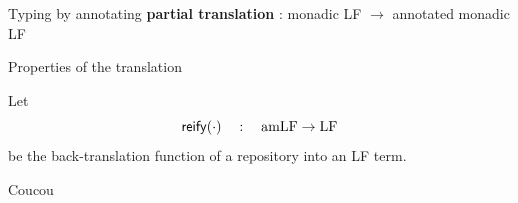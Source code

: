 \documentclass[ignorenonframetext,red]{beamer}
\newcommand\sz[1]{\hsubst{#1}\mmmv\mval}
\begin{document}
\begin{frame}{Typing by annotating}
  \textbf{partial translation} : monadic LF $\to$ annotated monadic LF
  \inXLFa
  \Large
  \begin{overlayarea}\textwidth{10em}
    \only<+>{
      $$
      \infer[VLam]{ \jannt\mr{\ebinddecl\me\mv\mf}\mo\mmf\mo }{
        \jannv\mr\me{\ulam\mv\mo}{\prd\mv\mf\mmf}{\lam\mv\mf\mo} }
      $$
    }
    \only<+>{
      $$
      \infer[LCons]{ \jannv\mr\me\mval\mf\mval \and
        \jannl\mr\me{\hsubst\mmf\mv\mval}\ma\ma{\lapp\mcf\ma} }{
        \jannl\mr\me{\prd\mv\mf\mmf}{\lcons\mval\ma}{\lcons\mval\ma}{\lapp\mcf\ma}
      }
      $$
    } 
    \normalsize
    \only<+>{
      \begin{align*}
        \sz{(\prd\mv\mf\mmf)} &= \prd\mv{\sz\mf}{\sz\mmf} \\
        \sz{(\sapply\ms{\lapp\mcf\ma})} &=
        \sapply{\sz\ms}{\lapp\mcf{\sz\ma}} \\[1em]
        \sz{(\scons\ms\mmv{\lapp\mv\ma:\lapp\mcf\mma})} &=
        \scons{(\sz\ms)}\mmv{\lapp\mv{\sz\ma}:\lapp\mcf{\sz\mma}} \\
        \sz{(\scons\ms\mmv{\lapp\mmmv\ma:\lapp\mcf\mma})} &=
        \fred\mmv\ms\mval\ma \\[1em]
        \fred\mmv\ms{\mh:\lapp\mcf\ma}\lnil &=
        \scons\ms\mmv{\mh:\lapp\mcf\ma} \\
        \fred\mmv\ms{\lam\mv\mf\mo}{(\lcons\mval\ma)} &=
        \fred\mmv{\ms\cup\mms}\mmval\ma
        \qquad\text{if}\quad
        \hsubst\mo\mv\mval = (\sapply\mms\mmval) \\
        &\vdots
      \end{align*}
    }
  \end{overlayarea}
\end{frame}

\begin{frame}{Properties of the translation}
  \begin{definition}
    Let $${\rm\mathsf{reify}}({\cdot}) \quad:\quad \text{amLF} \to \text{LF}$$ be the back-translation
    function of a repository into an LF term.
  \end{definition}
  \begin{theorem}
    Coucou
  \end{theorem}
\end{frame}
\end{document}
